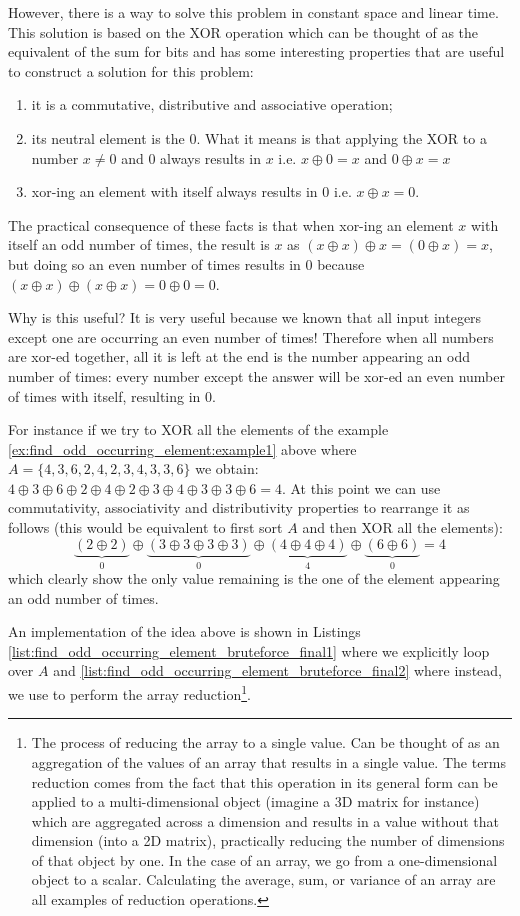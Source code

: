 However, there is a way to solve this problem in constant space and linear time. 
This solution is based on the XOR operation which can be thought of as the equivalent of the sum for bits and has some interesting properties that are useful to construct a solution for this problem:
\begin{enumerate}
	\item it is a commutative, distributive and associative operation;
	\item its neutral element is the $0$. What it means is that applying the XOR to a number $x \neq 0$ and $0$  always results in $x$ i.e. $x \oplus 0 = x$ and $0 \oplus x = x$
	\item xor-ing an element with itself always results in 0 i.e. $x \oplus x = 0$.
\end{enumerate}
The practical consequence of these facts is that when xor-ing an element $x$ with itself an odd number of times, the result is $x$ as $(x \oplus x) \oplus x  = (0 \oplus x) = x$, but doing so an even number of times results in $0$ because  $(x \oplus x) \oplus (x \oplus x) = 0 \oplus 0 = 0$.

Why is this useful? It is very useful because we known that all input integers except one are occurring an even number of times! Therefore when all numbers are xor-ed together, all it is left at the end is the number appearing an odd number of times: every number except the answer will be xor-ed an even number of times with itself, resulting in $0$. 


For instance if we try to XOR all the elements of the example \ref{ex:find_odd_occurring_element:example1} above where $A=\{4,3,6,2,4,2,3,4,3,3,6\}$ we obtain: $4 \oplus 3 \oplus  6 \oplus 2 \oplus 4 \oplus 2 \oplus 3 \oplus 4 \oplus 3 \oplus 3 \oplus 6 = 4$. At this point we can use commutativity, associativity and distributivity properties to rearrange it as follows (this would be equivalent to first sort $A$ and then XOR all the elements): 
$$\underbrace{(2 \oplus 2)}_{0} \oplus \underbrace{(3 \oplus 3 \oplus 3 \oplus 3)}_{0} \oplus \underbrace{(4 \oplus 4 \oplus 4)}_{4} \oplus \underbrace{(6 \oplus 6)}_{0} = 4$$ which clearly show the only value remaining is the one of the element appearing an odd number of times.


An implementation of the idea above is shown in Listings \ref{list:find_odd_occurring_element_bruteforce_final1} where we explicitly loop over $A$ and \ref{list:find_odd_occurring_element_bruteforce_final2} where instead, we use  to perform the array reduction\footnote{
	The process of reducing the array to a single value. Can be thought of as an aggregation of the values of an array that results in a single value. The terms reduction comes from the fact that this operation in its general form can be applied to a multi-dimensional object (imagine a 3D matrix for instance)  which are aggregated across a dimension and results in a value without that dimension (into a 2D matrix), practically reducing the number of dimensions of that object by one. In the case of an array, we go from a one-dimensional object to a scalar. Calculating the average, sum, or variance of an array are all examples of reduction operations.}.

